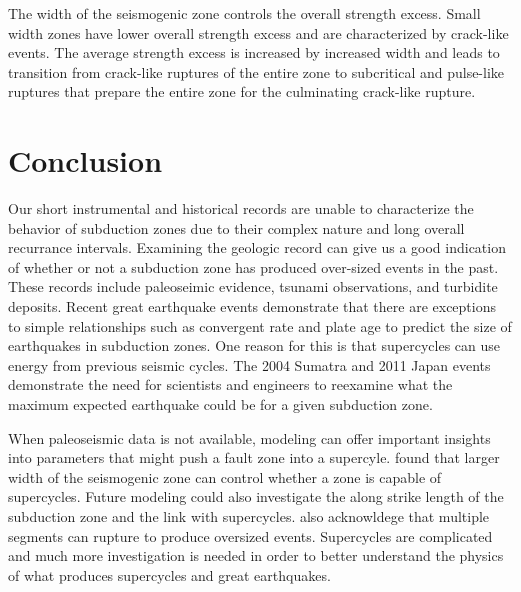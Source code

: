 \documentclass[]{proposalnsf}
\begin{document}
The width of the seismogenic zone controls the overall strength excess. Small width zones have lower overall strength excess and are characterized by crack-like events. The average strength excess is increased by increased width and leads to transition from crack-like ruptures of the entire zone to subcritical and pulse-like ruptures that prepare the entire zone for the culminating crack-like rupture. 


\section{Conclusion}
Our short instrumental and historical records are unable to characterize the behavior of subduction zones due to their complex nature and long overall recurrance intervals. Examining the geologic record can give us a good indication of whether or not a subduction zone has produced over-sized events in the past. These records include paleoseimic evidence, tsunami observations, and turbidite deposits. Recent great earthquake events demonstrate that there are exceptions to simple relationships such as convergent rate and plate age to predict the size of earthquakes in subduction zones. One reason for this is that supercycles can use energy from previous seismic cycles. The 2004 Sumatra and 2011 Japan events demonstrate the need for scientists and engineers to reexamine what the maximum expected earthquake could be for a given subduction zone. 

When paleoseismic data is not available, modeling can offer important insights into parameters that might push a fault zone into a supercyle. \citet{Herrendorfer2015} found that larger width of the seismogenic zone can control whether a zone is capable of supercycles. Future modeling could also investigate the along strike length of the subduction zone and the link with supercycles. \citet{Herrendorfer2015} also acknowldege that multiple segments can rupture to produce oversized events. Supercycles are complicated and much more investigation is needed in order to better understand the physics of what produces supercycles and great earthquakes.  
\end{document}

